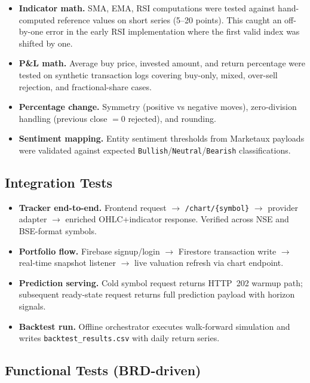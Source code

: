 \documentclass[12pt,a4paper]{report}
\numberwithin{equation}{chapter}
\begin{document}
\begin{itemize}
  \item \textbf{Indicator math.} SMA, EMA, RSI computations were tested against hand-computed reference values on short series (5--20 points). This caught an off-by-one error in the early RSI implementation where the first valid index was shifted by one.
  \item \textbf{P\&L math.} Average buy price, invested amount, and return percentage were tested on synthetic transaction logs covering buy-only, mixed, over-sell rejection, and fractional-share cases.
  \item \textbf{Percentage change.} Symmetry (positive vs negative moves), zero-division handling (previous close $= 0$ rejected), and rounding.
  \item \textbf{Sentiment mapping.} Entity sentiment thresholds from Marketaux payloads were validated against expected \texttt{Bullish}/\texttt{Neutral}/\texttt{Bearish} classifications.
\end{itemize}

\subsection{Integration Tests}

\begin{itemize}
  \item \textbf{Tracker end-to-end.} Frontend request $\rightarrow$ \texttt{/chart/\{symbol\}} $\rightarrow$ provider adapter $\rightarrow$ enriched OHLC+indicator response. Verified across NSE and BSE-format symbols.
  \item \textbf{Portfolio flow.} Firebase signup/login $\rightarrow$ Firestore transaction write $\rightarrow$ real-time snapshot listener $\rightarrow$ live valuation refresh via chart endpoint.
  \item \textbf{Prediction serving.} Cold symbol request returns HTTP~202 warmup path; subsequent ready-state request returns full prediction payload with horizon signals.
  \item \textbf{Backtest run.} Offline orchestrator executes walk-forward simulation and writes \texttt{backtest\_results.csv} with daily return series.
\end{itemize}

\subsection{Functional Tests (BRD-driven)}
\end{document}
